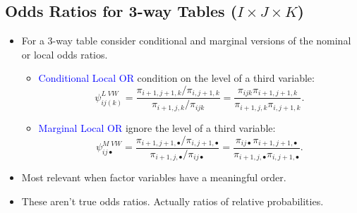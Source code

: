 \documentclass{article}\usepackage[]{graphicx}\usepackage[svgnames]{xcolor}
\begin{document}
\subsection*{Odds Ratios for 3-way Tables ($ I\times J\times K $)}
\begin{itemize}
    \item For a 3-way table consider conditional and marginal versions of the nominal or
          local odds ratios.
          \begin{itemize}
              \item \textcolor{Blue}{Conditional Local OR} condition on the level of a third variable:
                    \[ \psi_{ij(k)}^{L\;VW}=\frac{\pi_{i+1,j+1,k}/\pi_{i,j+1,k}}{\pi_{i+1,j,k}/\pi_{ijk}}=\frac{\pi_{ijk}\pi_{i+1,j+1,k}}{\pi_{i+1,j,k}\pi_{i,j+1,k}}. \]
              \item \textcolor{Blue}{Marginal Local OR} ignore the level of a third variable:
                    \[ \psi_{ij\bullet}^{M\;VW}
                        =\frac{\pi_{i+1,j+1,\bullet}/\pi_{i,j+1,\bullet}}{\pi_{i+1,j,\bullet}/\pi_{ij\bullet}}
                        =\frac{\pi_{ij\bullet}\pi_{i+1,j+1,\bullet}}{\pi_{i+1,j,\bullet}\pi_{i,j+1,\bullet}}. \]
          \end{itemize}
    \item Most relevant when factor variables have a meaningful order.
    \item These aren't true odds ratios. Actually ratios of relative probabilities.
\end{itemize}
\end{document}
